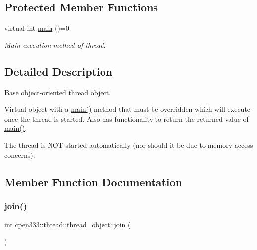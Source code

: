 \subsection*{Protected Member Functions}
\begin{DoxyCompactItemize}
\item 
virtual int \hyperlink{classcpen333_1_1thread_1_1thread__object_adbd74f6f7461d90a1c12e8078aa5f3af}{main} ()=0
\begin{DoxyCompactList}\small\item\em Main execution method of thread. \end{DoxyCompactList}\end{DoxyCompactItemize}


\subsection{Detailed Description}
Base object-\/oriented thread object. 

Virtual object with a \hyperlink{classcpen333_1_1thread_1_1thread__object_adbd74f6f7461d90a1c12e8078aa5f3af}{main()} method that must be overridden which will execute once the thread is started. Also has functionality to return the returned value of \hyperlink{classcpen333_1_1thread_1_1thread__object_adbd74f6f7461d90a1c12e8078aa5f3af}{main()}.

The thread is N\+OT started automatically (nor should it be due to memory access concerns). 

\subsection{Member Function Documentation}
\mbox{\label{classcpen333_1_1thread_1_1thread__object_ac7334918eabfcf855cec00ed2a68a039}} 
\subsubsection{\texorpdfstring{join()}{join()}}
{\footnotesize\ttfamily int cpen333\+::thread\+::thread\+\_\+object\+::join (\begin{DoxyParamCaption}{ }\end{DoxyParamCaption})\hspace{0.3cm}{\ttfamily [inline]}}



